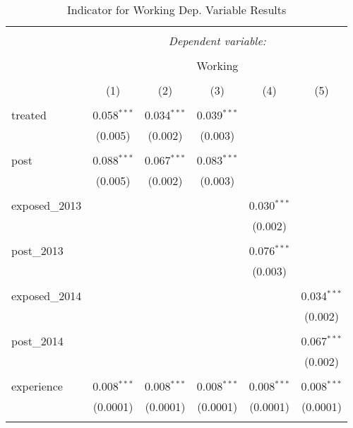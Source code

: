 
\begin{table}[!htbp] \centering 
  \caption{Indicator for Working Dep. Variable Results} 
  \label{} 
  \begin{adjustbox}{width=\textwidth}
\begin{tabular}{@{\extracolsep{5pt}}lccccc} 
\\[-1.8ex]\hline 
\hline \\[-1.8ex] 
 & \multicolumn{5}{c}{\textit{Dependent variable:}} \\ 
\cline{2-6} 
\\[-1.8ex] & \multicolumn{5}{c}{Working} \\ 
\\[-1.8ex] & (1) & (2) & (3) & (4) & (5)\\ 
\hline \\[-1.8ex] 
 treated & 0.058$^{***}$ & 0.034$^{***}$ & 0.039$^{***}$ &  &  \\ 
  & (0.005) & (0.002) & (0.003) &  &  \\ 
  & & & & & \\ 
 post & 0.088$^{***}$ & 0.067$^{***}$ & 0.083$^{***}$ &  &  \\ 
  & (0.005) & (0.002) & (0.003) &  &  \\ 
  & & & & & \\ 
 exposed\_2013 &  &  &  & 0.030$^{***}$ &  \\ 
  &  &  &  & (0.002) &  \\ 
  & & & & & \\ 
 post\_2013 &  &  &  & 0.076$^{***}$ &  \\ 
  &  &  &  & (0.003) &  \\ 
  & & & & & \\ 
 exposed\_2014 &  &  &  &  & 0.034$^{***}$ \\ 
  &  &  &  &  & (0.002) \\ 
  & & & & & \\ 
 post\_2014 &  &  &  &  & 0.067$^{***}$ \\ 
  &  &  &  &  & (0.002) \\ 
  & & & & & \\ 
 experience & 0.008$^{***}$ & 0.008$^{***}$ & 0.008$^{***}$ & 0.008$^{***}$ & 0.008$^{***}$ \\ 
  & (0.0001) & (0.0001) & (0.0001) & (0.0001) & (0.0001) \\ 
  & & & & & \\ 

\end{tabular}
\end{adjustbox}
\end{table}
